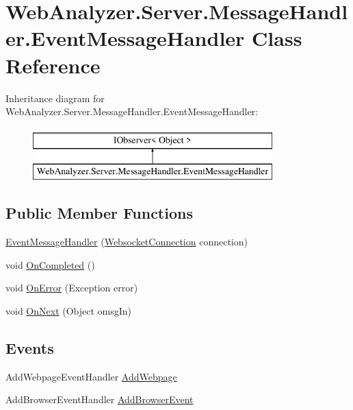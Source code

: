 \hypertarget{class_web_analyzer_1_1_server_1_1_message_handler_1_1_event_message_handler}{}\section{Web\+Analyzer.\+Server.\+Message\+Handler.\+Event\+Message\+Handler Class Reference}
\label{class_web_analyzer_1_1_server_1_1_message_handler_1_1_event_message_handler}
Inheritance diagram for Web\+Analyzer.\+Server.\+Message\+Handler.\+Event\+Message\+Handler\+:\begin{figure}[H]
\begin{center}
\leavevmode
\includegraphics[height=2.000000cm]{class_web_analyzer_1_1_server_1_1_message_handler_1_1_event_message_handler}
\end{center}
\end{figure}
\subsection*{Public Member Functions}
\begin{DoxyCompactItemize}
\item 
\hyperlink{class_web_analyzer_1_1_server_1_1_message_handler_1_1_event_message_handler_aad5a6a0c04c3734ed4f4f246429dcc96}{Event\+Message\+Handler} (\hyperlink{class_web_analyzer_1_1_server_1_1_websocket_connection}{Websocket\+Connection} connection)
\item 
void \hyperlink{class_web_analyzer_1_1_server_1_1_message_handler_1_1_event_message_handler_a19e447a4cbabc5a9f8b3a04af58c5d43}{On\+Completed} ()
\item 
void \hyperlink{class_web_analyzer_1_1_server_1_1_message_handler_1_1_event_message_handler_a88c6d373560e656f48dd245a60dd5050}{On\+Error} (Exception error)
\item 
void \hyperlink{class_web_analyzer_1_1_server_1_1_message_handler_1_1_event_message_handler_ab517345494b9c59dcd2fefadcdc7b459}{On\+Next} (Object omsg\+In)
\end{DoxyCompactItemize}
\subsection*{Events}
\begin{DoxyCompactItemize}
\item 
Add\+Webpage\+Event\+Handler \hyperlink{class_web_analyzer_1_1_server_1_1_message_handler_1_1_event_message_handler_afe82749d8d848e38bb19ddc56f9c7fe6}{Add\+Webpage}
\item 
Add\+Browser\+Event\+Handler \hyperlink{class_web_analyzer_1_1_server_1_1_message_handler_1_1_event_message_handler_ab5371d9836863ebc41e4c86c9ebc348e}{Add\+Browser\+Event}
\end{DoxyCompactItemize}
